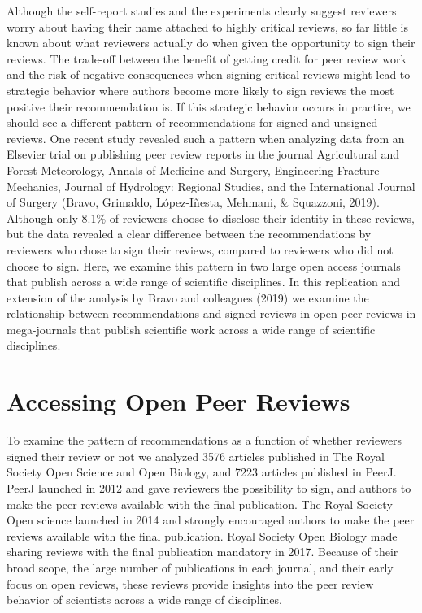 \documentclass[,jou, a4paper,floatsintext]{apa6}
\begin{document}
Although the self-report studies and the experiments clearly suggest reviewers worry about having their name attached to highly critical reviews, so far little is known about what reviewers actually do when given the opportunity to sign their reviews. The trade-off between the benefit of getting credit for peer review work and the risk of negative consequences when signing critical reviews might lead to strategic behavior where authors become more likely to sign reviews the most positive their recommendation is. If this strategic behavior occurs in practice, we should see a different pattern of recommendations for signed and unsigned reviews. One recent study revealed such a pattern when analyzing data from an Elsevier trial on publishing peer review reports in the journal Agricultural and Forest Meteorology, Annals of Medicine and Surgery, Engineering Fracture Mechanics, Journal of Hydrology: Regional Studies, and the International Journal of Surgery (Bravo, Grimaldo, López-Iñesta, Mehmani, \& Squazzoni, 2019). Although only 8.1\% of reviewers choose to disclose their identity in these reviews, but the data revealed a clear difference between the recommendations by reviewers who chose to sign their reviews, compared to reviewers who did not choose to sign. Here, we examine this pattern in two large open access journals that publish across a wide range of scientific disciplines. In this replication and extension of the analysis by Bravo and colleagues (2019) we examine the relationship between recommendations and signed reviews in open peer reviews in mega-journals that publish scientific work across a wide range of scientific disciplines.

\hypertarget{accessing-open-peer-reviews}{%
\section{Accessing Open Peer Reviews}\label{accessing-open-peer-reviews}}

To examine the pattern of recommendations as a function of whether reviewers signed their review or not we analyzed 3576 articles published in The Royal Society Open Science and Open Biology, and 7223 articles published in PeerJ. PeerJ launched in 2012 and gave reviewers the possibility to sign, and authors to make the peer reviews available with the final publication. The Royal Society Open science launched in 2014 and strongly encouraged authors to make the peer reviews available with the final publication. Royal Society Open Biology made sharing reviews with the final publication mandatory in 2017. Because of their broad scope, the large number of publications in each journal, and their early focus on open reviews, these reviews provide insights into the peer review behavior of scientists across a wide range of disciplines.
\end{document}
